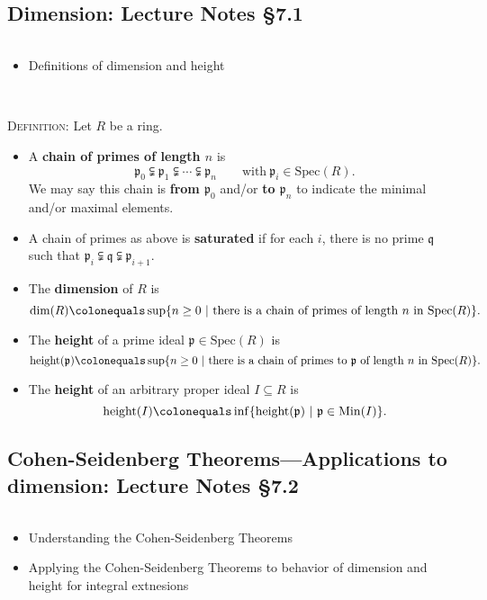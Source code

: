 \documentclass[12pt]{amsart}
\newcommand{\p}{\mathfrak{p}}
\newcommand{\q}{\mathfrak{q}}
\newcommand{\hgt}{\mathrm{height}}
\newcommand{\Spec}{\mathrm{Spec}}
\newcommand{\Min}{\mathrm{Min}}
\newcommand{\0}{$\phantom{.}$}
\newcommand{\1}{\mathbbm{1}}
\newcommand\ceq{\colonequals}
\begin{document}
\setcounter{subsection}{28}
\subsection{Dimension: Lecture Notes \S7.1} \0

\begin{framed}
\begin{itemize}
\item Definitions of dimension and height
\end{itemize}

\end{framed}

	\

\noindent \textsc{Definition:} Let $R$ be a ring. 
\begin{itemize}
\item A \textbf{chain of primes of length $n$} is
\[ \p_0 \subsetneqq \p_1 \subsetneqq \cdots \subsetneqq \p_n \qquad \text{with} \ \p_i\in \Spec(R).\]
We may say this chain is \textbf{from $\p_0$} and/or \textbf{to $\p_n$} to indicate the minimal and/or maximal elements.
\item A chain of primes as above is \textbf{saturated} if for each $i$, there is no prime $\q$ such that ${\p_i \subsetneqq \q \subsetneqq \p_{i+1}}$.
\item The \textbf{dimension} of $R$ is 
\[ \dim(R) \ceq \sup\{ n\geq 0 \ | \ \text{there is a chain of primes of length $n$ in $\Spec(R)$}\}.\]
\item The \textbf{height} of a prime ideal $\p\in \Spec(R)$ is
\[ \hgt(\p)\ceq  \sup\{ n\geq 0 \ | \ \text{there is a chain of primes to $\p$ of length $n$ in $\Spec(R)$}\}.\]
\item The \textbf{height} of an arbitrary proper ideal $I\subseteq R$ is
\[ \hgt(I)\ceq  \inf\{ \hgt(\p) \ | \ \p\in \Min(I) \}.\]
\end{itemize}



\newpage



\subsection{Cohen-Seidenberg Theorems---Applications to dimension: Lecture Notes \S7.2} \0

\begin{framed}
\begin{itemize}
\item Understanding the Cohen-Seidenberg Theorems
\item Applying the Cohen-Seidenberg Theorems to behavior of dimension and height for integral extnesions
\end{itemize}
\end{framed}
\end{document}
